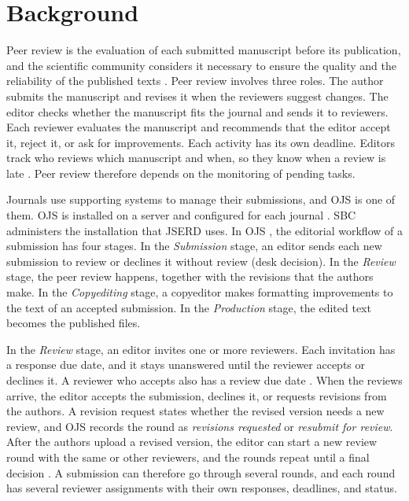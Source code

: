 \documentclass[12pt]{article}
\begin{document}
\section{Background}
\label{sec-background}

Peer review is the evaluation of each submitted manuscript before its
publication, and the scientific community considers it necessary to ensure
the quality and the reliability of the published texts
\cite{mueller2006comunicacao}. Peer review involves three roles. The author submits the manuscript and revises it when the
reviewers suggest changes. The editor checks whether the manuscript fits the
journal and sends it to reviewers. Each reviewer evaluates the manuscript
and recommends that the editor accept it, reject it, or ask for
improvements. Each activity has its own deadline. Editors track who reviews which manuscript and when, so
they know when a review is late \cite{kelly2014peer}. Peer review therefore
depends on the monitoring of pending tasks.

Journals use supporting systems to manage their submissions, and OJS is one
of them. OJS is installed on a server and configured for each journal
\cite{willinsky2005ojs}. SBC administers the installation that JSERD uses.
In OJS \cite{pkpguia}, the editorial workflow of a submission has four stages. In the
\textit{Submission} stage, an editor sends each new submission to review or
declines it without review (desk decision). In the
\textit{Review} stage, the peer review happens, together with the revisions
that the authors make. In the \textit{Copyediting} stage, a copyeditor
makes formatting improvements to the text of an accepted submission. In the \textit{Production}
stage, the edited text becomes the published files.

In the \textit{Review} stage, an editor invites one or more reviewers. Each
invitation has a response due date, and it stays unanswered until the
reviewer accepts or declines it. A reviewer who accepts also has a review
due date \cite{pkpworkflow}. When the reviews arrive, the editor accepts the
submission, declines it, or requests revisions from the authors. A revision
request states whether the revised version needs a new review, and OJS
records the round as \textit{revisions requested} or \textit{resubmit for
review}. After the authors upload a revised version, the editor can start a
new review round with the same or other reviewers, and the rounds repeat
until a final decision \cite{pkpguia,pkplib}. A submission can therefore go
through several rounds, and each round has several reviewer assignments with
their own responses, deadlines, and status.
\end{document}

